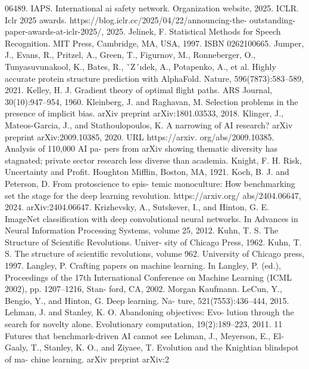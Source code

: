 06489.
IAPS. International ai safety network. Organization website,
2025.
ICLR.
Iclr
2025
awards.
https://blog.iclr.cc/2025/04/22/announcing-the-
outstanding-paper-awards-at-iclr-2025/, 2025.
Jelinek, F. Statistical Methods for Speech Recognition. MIT
Press, Cambridge, MA, USA, 1997. ISBN 0262100665.
Jumper, J., Evans, R., Pritzel, A., Green, T., Figurnov, M.,
Ronneberger, O., Tunyasuvunakool, K., Bates, R., ˇZ´ıdek,
A., Potapenko, A., et al. Highly accurate protein structure
prediction with AlphaFold. Nature, 596(7873):583–589,
2021.
Kelley, H. J. Gradient theory of optimal flight paths. ARS
Journal, 30(10):947–954, 1960.
Kleinberg, J. and Raghavan, M.
Selection problems
in the presence of implicit bias.
arXiv preprint
arXiv:1801.03533, 2018.
Klinger, J., Mateos-Garcia, J., and Stathoulopoulos,
K.
A narrowing of AI research?
arXiv preprint
arXiv:2009.10385, 2020.
URL https://arxiv.
org/abs/2009.10385. Analysis of 110,000 AI pa-
pers from arXiv showing thematic diversity has stagnated;
private sector research less diverse than academia.
Knight, F. H.
Risk, Uncertainty and Profit. Houghton
Mifflin, Boston, MA, 1921.
Koch, B. J. and Peterson, D. From protoscience to epis-
temic monoculture: How benchmarking set the stage for
the deep learning revolution. https://arxiv.org/
abs/2404.06647, 2024. arXiv:2404.06647.
Krizhevsky, A., Sutskever, I., and Hinton, G. E. ImageNet
classification with deep convolutional neural networks.
In Advances in Neural Information Processing Systems,
volume 25, 2012.
Kuhn, T. S. The Structure of Scientific Revolutions. Univer-
sity of Chicago Press, 1962.
Kuhn, T. S. The structure of scientific revolutions, volume
962. University of Chicago press, 1997.
Langley, P. Crafting papers on machine learning. In Langley,
P. (ed.), Proceedings of the 17th International Conference
on Machine Learning (ICML 2002), pp. 1207–1216, Stan-
ford, CA, 2002. Morgan Kaufmann.
LeCun, Y., Bengio, Y., and Hinton, G. Deep learning. Na-
ture, 521(7553):436–444, 2015.
Lehman, J. and Stanley, K. O. Abandoning objectives: Evo-
lution through the search for novelty alone. Evolutionary
computation, 19(2):189–223, 2011.
11
Futures that benchmark-driven AI cannot see
Lehman, J., Meyerson, E., El-Gaaly, T., Stanley, K. O., and
Ziyaee, T. Evolution and the Knightian blindspot of ma-
chine learning. arXiv preprint arXiv:2


